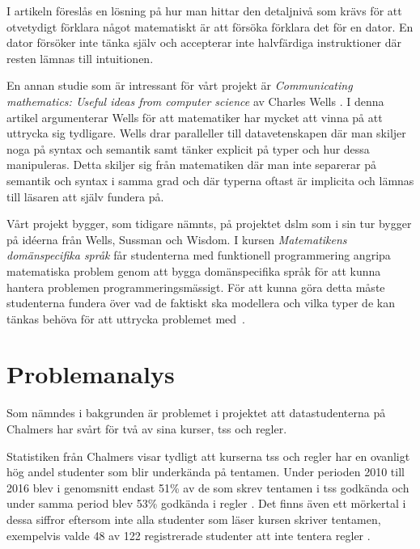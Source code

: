 \documentclass[12pt,a4paper,twoside,openright]{article}
\begin{document}
I artikeln föreslås en lösning på hur man hittar den detaljnivå som
krävs för att otvetydigt förklara något matematiskt är att försöka
förklara det för en dator. En dator försöker inte tänka själv och
accepterar inte halvfärdiga instruktioner där resten lämnas till
intuitionen.

En annan studie som är intressant för vårt projekt är
\textit{Communicating mathematics: Useful ideas from computer science}
av Charles Wells \cite{wells1995communicating}. I denna artikel
argumenterar Wells för att matematiker har mycket att vinna på att
uttrycka sig tydligare. Wells drar paralleller till datavetenskapen
där man skiljer noga på syntax och semantik samt tänker explicit på
typer och hur dessa manipuleras. Detta skiljer sig från matematiken
där man inte separerar på semantik och syntax i samma grad och där
typerna oftast är implicita och lämnas till läsaren att själv fundera
på.

Vårt projekt bygger, som tidigare nämnts, på projektet \gls{dslm} som
i sin tur bygger på idéerna från Wells, Sussman och Wisdom.  I kursen
\textit{Matematikens domänspecifika språk} får studenterna med
funktionell programmering angripa matematiska problem genom att bygga
domänspecifika språk för att kunna hantera problemen
programmeringsmässigt. För att kunna göra detta måste studenterna
fundera över vad de faktiskt ska modellera och vilka typer de kan
tänkas behöva för att uttrycka problemet
med~\cite{kursplan:dslsofmath}.

\newpage

\section{Problemanalys}

Som nämndes i bakgrunden är problemet i projektet att datastudenterna
på Chalmers har svårt för två av sina kurser, \gls{tss} och
\gls{regler}.

Statistiken från Chalmers visar tydligt att kurserna \gls{tss} och
\gls{regler} har en ovanligt hög andel studenter som blir underkända
på tentamen. Under perioden 2010 till 2016 blev i genomsnitt endast
51\% av de som skrev tentamen i \gls{tss} godkända och under samma
period blev 53\% godkända i \gls{regler} \cite{tentastatistik}.
Det finns även ett mörkertal i dessa siffror eftersom inte alla
studenter som läser kursen skriver tentamen, exempelvis valde 48 av
122 registrerade studenter att inte tentera \gls{regler}
\cite{kursinformation:ere102:14-15}.
\end{document}
